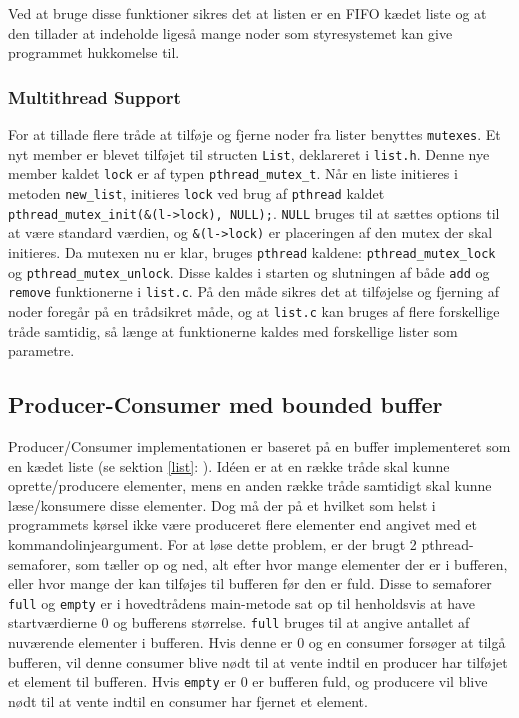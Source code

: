 Ved at bruge disse funktioner sikres det at listen er en FIFO kædet liste og at den tillader at indeholde ligeså mange noder som styresystemet kan give programmet hukkomelse til. 

\subsubsection{Multithread Support}
For at tillade flere tråde at tilføje og fjerne noder fra lister benyttes \texttt{mutexes}. Et nyt member er blevet tilføjet til structen \texttt{List}, deklareret i \texttt{list.h}. Denne nye member kaldet \texttt{lock} er af typen \texttt{pthread\_mutex\_t}. Når en liste initieres i metoden \texttt{new\_list}, initieres \texttt{lock} ved brug af \texttt{pthread} kaldet \texttt{pthread\_mutex\_init(\&(l->lock), NULL);}. \texttt{NULL} bruges til at sættes options til at være standard værdien, og \texttt{\&(l->lock)} er placeringen af den mutex der skal initieres. Da mutexen nu er klar, bruges \texttt{pthread} kaldene: \texttt{pthread\_mutex\_lock} og \texttt{pthread\_mutex\_unlock}. Disse kaldes i starten og slutningen af både \texttt{add} og \texttt{remove} funktionerne i \texttt{list.c}. På den måde sikres det at tilføjelse og fjerning af noder foregår på en trådsikret måde, og at \texttt{list.c} kan bruges af flere forskellige tråde samtidig, så længe at funktionerne kaldes med forskellige lister som parametre.

\subsection{Producer-Consumer med bounded buffer}
Producer/Consumer implementationen er baseret på en buffer implementeret som en kædet liste (se sektion \ref{list}: ). Idéen er at en række tråde skal kunne oprette/producere elementer, mens en anden række tråde samtidigt skal kunne læse/konsumere disse elementer. Dog må der på et hvilket som helst i programmets kørsel ikke være produceret flere elementer end angivet med et kommandolinjeargument. For at løse dette problem, er der brugt 2 pthread-semaforer, som tæller op og ned, alt efter hvor mange elementer der er i bufferen, eller hvor mange der kan tilføjes til bufferen før den er fuld. Disse to semaforer \texttt{full} og \texttt{empty} er i hovedtrådens main-metode sat op til henholdsvis at have startværdierne 0 og bufferens størrelse. \texttt{full} bruges til at angive antallet af nuværende elementer i bufferen. Hvis denne er 0 og en consumer forsøger at tilgå bufferen, vil denne consumer blive nødt til at vente indtil en producer har tilføjet et element til bufferen. Hvis \texttt{empty} er 0 er bufferen fuld, og producere vil blive nødt til at vente indtil en consumer har fjernet et element.\\

